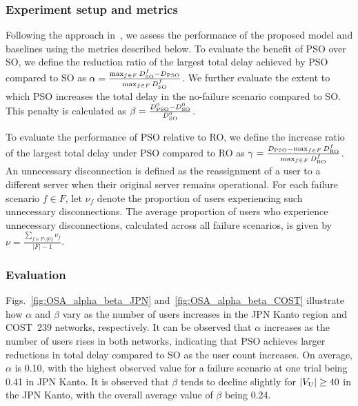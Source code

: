 \documentclass[10pt, letterpaper]{IEEEtran}
\begin{document}
\begin{CJK}{UTF8}{ipxm}
\subsubsection{Experiment setup and metrics}
Following the approach in~\cite{5_9_13_Kamrul2010, 5_9_Masuda2020}, we assess the performance of the proposed model and baselines using the metrics described below.
To evaluate the benefit of PSO over SO, we define the reduction ratio of the largest total delay achieved by PSO compared to SO as
$\alpha = \frac{\max_{f \in F}D^f_{\rm SO} - D_{\rm PSO}}{\max_{f \in F}D^f_{\rm SO}}$.
We further evaluate the extent to which PSO increases the total delay in the no-failure scenario compared to SO. This penalty is calculated as
$\beta = \frac{D^0_{\rm PSO} - D^0_{\rm SO}}{D^0_{\rm SO}}$.

To evaluate the performance of PSO relative to RO, we define the increase ratio of the largest total delay under PSO compared to RO as
$\gamma = \frac{D_{\rm PSO} - \max_{f \in F}D^f_{\rm RO}}{\max_{f \in F}D^f_{\rm RO}}$.
An unnecessary disconnection is defined as the reassignment of a user to a different server when their original server remains operational.
For each failure scenario $f \in F$, let $\nu_f$ denote the proportion of users experiencing such unnecessary disconnections.
The average proportion of users who experience unnecessary disconnections, calculated across all failure scenarios, is given by
$\nu = \frac{\sum_{f \in F \setminus \{0\}}\nu_f}{|F| - 1}$.

\subsubsection{Evaluation}
Figs.~\ref{fig:OSA_alpha_beta_JPN} and~\ref{fig:OSA_alpha_beta_COST} illustrate how $\alpha$ and $\beta$ vary as the number of users increases in the JPN Kanto region and COST~239 networks, respectively.
It can be observed that $\alpha$ increases as the number of users rises in both networks, indicating that PSO achieves larger reductions in total delay compared to SO as the user count increases.
On average, $\alpha$ is 0.10, with the highest observed value for a failure scenario at one trial being 0.41 in JPN Kanto.
It is observed that $\beta$ tends to decline slightly for $|V_{\rm U}| \geq 40$ in the JPN Kanto, with the overall average value of $\beta$ being 0.24.


\end{CJK}
\end{document}
